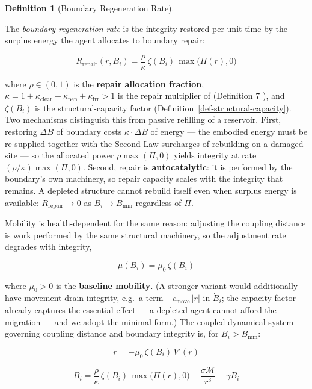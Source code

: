 \documentclass[11pt]{article}
\theoremstyle{plain}
\theoremstyle{definition}
\newtheorem{definition}{Definition}
\theoremstyle{remark}
\begin{document}
\begin{definition}[Boundary Regeneration Rate]
\label{def-boundary-regeneration-rate}

The \emph{boundary regeneration rate} is the integrity restored per unit time by the surplus energy the agent allocates to boundary repair:

$$R_{\text{repair}}(r, B_i) = \frac{\rho}{\kappa}\, \zeta(B_i)\, \max\bigl(\Pi(r), 0\bigr)$$

where $\rho \in (0, 1)$ is the \textbf{repair allocation fraction}, $\kappa = 1 + \kappa_{\text{clear}} + \kappa_{\text{pen}} + \kappa_{\text{irr}} > 1$ is the repair multiplier of \citep{TC-IV} (Definition 7 \citep{TC-IV}), and $\zeta(B_i)$ is the structural-capacity factor (Definition~\ref{def-structural-capacity}). Two mechanisms distinguish this from passive refilling of a reservoir. First, restoring $\Delta B$ of boundary costs $\kappa \cdot \Delta B$ of energy — the embodied energy must be re-supplied together with the Second-Law surcharges of rebuilding on a damaged site — so the allocated power $\rho \max(\Pi, 0)$ yields integrity at rate $(\rho/\kappa) \max(\Pi, 0)$. Second, repair is \textbf{autocatalytic}: it is performed by the boundary's own machinery, so repair capacity scales with the integrity that remains. A depleted structure cannot rebuild itself even when surplus energy is available: $R_{\text{repair}} \to 0$ as $B_i \to B_{\min}$ regardless of $\Pi$.
\end{definition}

Mobility is health-dependent for the same reason: adjusting the coupling
distance is work performed by the same structural machinery, so the
adjustment rate degrades with integrity,

\[\mu(B_i) = \mu_0 \, \zeta(B_i)\]

where \(\mu_0 > 0\) is the \textbf{baseline mobility}. (A stronger
variant would additionally have movement drain integrity, e.g.~a term
\(-c_{\text{move}}\,|\dot{r}|\) in \(\dot{B}_i\); the capacity factor
already captures the essential effect --- a depleted agent cannot afford
the migration --- and we adopt the minimal form.) The coupled dynamical
system governing coupling distance and boundary integrity is, for
\(B_i > B_{\min}\):

\[\dot{r} = -\mu_0\, \zeta(B_i)\, V'(r)\]

\[\dot{B}_i = \frac{\rho}{\kappa}\, \zeta(B_i)\, \max\bigl(\Pi(r), 0\bigr) - \frac{\sigma \mathcal{M}}{r^3} - \gamma B_i\]
\end{document}
